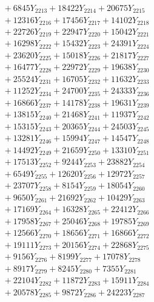 \documentclass[a4paper,10pt]{article}
\begin{document}
{\begin{align}
&\;  + 6845 Y_{2213} + 18422 Y_{2214} + 20675 Y_{2215} \\[0.3ex]
&\;  + 12316 Y_{2216} + 17456 Y_{2217} + 14102 Y_{2218} \\[0.5ex]\allowbreak
&\;  + 22726 Y_{2219} + 22947 Y_{2220} + 15042 Y_{2221} \\[0.3ex]
&\;  + 16298 Y_{2222} + 15432 Y_{2223} + 24391 Y_{2224} \\[0.3ex]
&\;  + 23620 Y_{2225} + 15018 Y_{2226} + 21817 Y_{2227} \\[0.3ex]
&\;  + 16477 Y_{2228} + 22972 Y_{2229} + 19638 Y_{2230} \\[0.3ex]
&\;  + 25524 Y_{2231} + 16705 Y_{2232} + 11632 Y_{2233} \\[0.3ex]
&\;  + 11252 Y_{2234} + 24700 Y_{2235} + 24333 Y_{2236} \\[0.3ex]
&\;  + 16866 Y_{2237} + 14178 Y_{2238} + 19631 Y_{2239} \\[0.3ex]
&\;  + 13815 Y_{2240} + 21468 Y_{2241} + 11937 Y_{2242} \\[0.3ex]
&\;  + 15315 Y_{2243} + 20365 Y_{2244} + 24503 Y_{2245} \\[0.3ex]
&\;  + 13281 Y_{2246} + 15994 Y_{2247} + 14547 Y_{2248} \\[0.5ex]\allowbreak
&\;  + 14492 Y_{2249} + 21659 Y_{2250} + 13310 Y_{2251} \\[0.3ex]
&\;  + 17513 Y_{2252} + 9244 Y_{2253} + 23882 Y_{2254} \\[0.3ex]
&\;  + 6549 Y_{2255} + 12620 Y_{2256} + 12972 Y_{2257} \\[0.3ex]
&\;  + 23707 Y_{2258} + 8154 Y_{2259} + 18054 Y_{2260} \\[0.3ex]
&\;  + 9650 Y_{2261} + 21692 Y_{2262} + 10429 Y_{2263} \\[0.3ex]
&\;  + 17169 Y_{2264} + 16328 Y_{2265} + 22412 Y_{2266} \\[0.3ex]
&\;  + 17958 Y_{2267} + 25046 Y_{2268} + 19785 Y_{2269} \\[0.3ex]
&\;  + 12566 Y_{2270} + 18656 Y_{2271} + 16866 Y_{2272} \\[0.3ex]
&\;  + 19111 Y_{2273} + 20156 Y_{2274} + 22868 Y_{2275} \\[0.3ex]
&\;  + 9156 Y_{2276} + 8199 Y_{2277} + 17078 Y_{2278} \\[0.5ex]\allowbreak
&\;  + 8917 Y_{2279} + 8245 Y_{2280} + 7355 Y_{2281} \\[0.3ex]
&\;  + 22104 Y_{2282} + 11872 Y_{2283} + 15911 Y_{2284} \\[0.3ex]
&\;  + 20578 Y_{2285} + 9872 Y_{2286} + 24223 Y_{2287} \\[0.3ex]

\end{align}}
\end{document}
